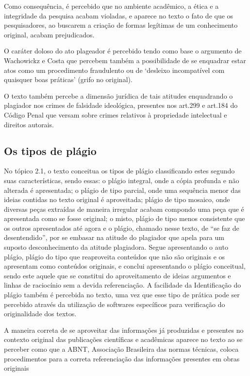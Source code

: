 \documentclass[
   article,       %
   12pt,          %
   oneside,       %
   a4paper,       %
   english,       %
   brazil,           %
   sumario=tradicional
   ]{abntex2}
\begin{document}
Como consequência, é percebido que no ambiente acadêmico, a ética e a integridade da pesquisa acabam violadas, e aparece no texto o fato de que os pesquisadores, ao buscarem a criação  de formas legítimas de um conhecimento original, acabam prejudicados. 

O caráter doloso do ato plageador é percebido tendo como base o argumento de Wachowickz e Costa que percebem também a possibilidade de se enquadrar estar atos como um procedimento fraudulento ou de ‘desleixo incompatível com quaisquer boas práticas’ (grifo no original).

O texto também percebe a dimensão jurídica de tais atitudes enquadrando o plagiador nos crimes de falsidade ideológica, presentes nos art.299 e art.184 do Código Penal que versam sobre crimes relativos à propriedade intelectual e direitos autorais.


\subsection{Os tipos de plágio}

No tópico 2.1, o texto conceitua os tipos de plágio classificando estes segundo suas características, sendo essas: o plágio integral, onde a cópia profunda e não alterada é apresentada; o plágio de tipo parcial, onde uma sequência menor das ideias contidas no texto original é aproveitada; plágio de tipo mosaico, onde diversas peças extraídas de maneira irregular acabam compondo uma peça que é apresentada como se fosse original; o misto, plágio de tipo menos consistente que os outros apresentados até agora e o plágio, chamado nesse texto, de “se faz de desentendido”, por se embasar na atitude do plagiador que apela para um suposto desconhecimento da atitude plagiadora. Segue apresentando o auto plágio, plágio do tipo que reaproveita conteúdos que não são originais e os apresentam como conteúdos originais, e conclui apresentando o plágio conceitual, sendo este aquele que se constitui do aproveitamento de ideias argumentos e linhas de raciocínio sem a devida referenciação.
A facilidade da Identificação do plágio também é percebida no texto, uma vez que esse tipo de prática pode ser percebido através da utilização de softwares específicos para verificação do originalidade dos textos.

A maneira correta de se aproveitar das informações já produzidas e presentes no contexto original das publicações científicas e acadêmicas aparece no texto ao se perceber como que a ABNT, Associação Brasileira das normas técnicas, coloca procedimentos para a correta referenciação das informações presentes em obras originais 
\end{document}
